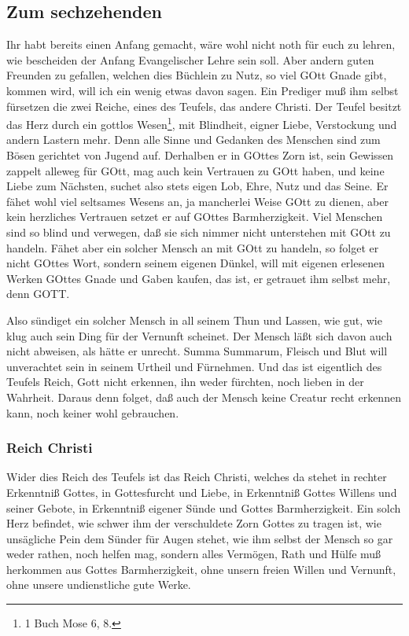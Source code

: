 \subsection{Zum sechzehenden}

Ihr habt bereits einen Anfang gemacht, wäre wohl nicht noth für euch zu lehren, wie bescheiden der Anfang Evangelischer Lehre sein soll. Aber andern guten Freunden zu gefallen, welchen dies Büchlein zu Nutz, so viel GOtt Gnade gibt, kommen wird, will ich ein wenig etwas davon sagen. Ein Prediger muß ihm selbst fürsetzen die zwei Reiche, eines des Teufels, das andere Christi. Der Teufel besitzt das Herz durch ein gottlos Wesen\footnote{1 Buch Mose 6, 8.}, mit Blindheit, eigner Liebe, Verstockung und andern Lastern mehr. Denn alle Sinne und Gedanken des Menschen sind zum Bösen gerichtet von Jugend auf. Derhalben er in GOttes Zorn ist, sein Gewissen zappelt alleweg für GOtt, mag auch kein Vertrauen zu GOtt haben, und keine Liebe zum Nächsten, suchet also stets eigen Lob, Ehre, Nutz und das Seine. Er fähet wohl viel seltsames Wesens an, ja mancherlei Weise GOtt zu dienen, aber kein herzliches Vertrauen setzet er auf GOttes Barmherzigkeit. Viel Menschen sind so blind und verwegen, daß sie sich nimmer nicht unterstehen mit GOtt zu handeln. Fähet aber ein solcher Mensch an mit GOtt zu handeln, so folget er nicht GOttes Wort, sondern seinem eigenen Dünkel, will mit eigenen erlesenen Werken GOttes Gnade und Gaben kaufen, das ist, er getrauet ihm selbst mehr, denn GOTT.

Also sündiget ein solcher Mensch in all seinem Thun und Lassen, wie gut, wie klug auch sein Ding für der Vernunft scheinet. Der Mensch läßt sich davon auch nicht abweisen, als hätte er unrecht. Summa Summarum, Fleisch und Blut will unverachtet sein in seinem Urtheil und Fürnehmen. Und das ist
eigentlich des Teufels Reich, Gott nicht erkennen, ihn weder fürchten, noch lieben in der Wahrheit. Daraus denn folget, daß auch der Mensch keine Creatur recht erkennen kann, noch keiner wohl gebrauchen.

\subsubsection{Reich Christi}

Wider dies Reich des Teufels ist das Reich Christi, welches da stehet in rechter Erkenntniß Gottes, in Gottesfurcht und Liebe, in Erkenntniß Gottes Willens und seiner Gebote, in Erkenntniß eigener Sünde und Gottes Barmherzigkeit. Ein solch Herz befindet, wie schwer ihm der verschuldete Zorn Gottes zu tragen ist, wie unsägliche Pein dem Sünder für Augen stehet, wie ihm selbst der Mensch so gar weder rathen, noch helfen mag, sondern alles Vermögen, Rath und Hülfe muß herkommen aus Gottes Barmherzigkeit, ohne unsern freien Willen und Vernunft, ohne unsere undienstliche gute Werke.

